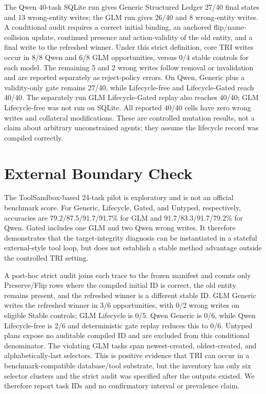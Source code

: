 \documentclass[10pt]{article}
\begin{document}
The Qwen 40-task SQLite run gives Generic Structured Ledger 27/40 final states and 13
wrong-entity writes; the GLM run gives 26/40 and 8 wrong-entity writes. A conditional audit
requires a correct initial binding, an anchored flip/name-collision update, continued presence
and action-validity of the old entity, and a final write to the refreshed winner. Under this
strict definition, core TRI writes occur in 8/8 Qwen and 6/8 GLM opportunities, versus 0/4
stable controls for each model. The remaining 5 and 2 wrong writes follow removal or invalidation
and are reported separately as reject-policy errors. On Qwen, Generic
plus a validity-only gate remains 27/40, while Lifecycle-free and Lifecycle-Gated reach 40/40.
The separately run GLM Lifecycle-Gated replay also reaches 40/40; GLM Lifecycle-free was not
run on SQLite. All reported 40/40 cells have zero wrong writes and collateral modifications.
These are controlled mutation results, not a claim about arbitrary
unconstrained agents: they assume the lifecycle record was compiled correctly.

\section{External Boundary Check}
The ToolSandbox-based 24-task pilot is exploratory and is not an official benchmark score.
For Generic, Lifecycle, Gated, and Untyped, respectively, accuracies are
79.2/87.5/91.7/91.7\% for GLM and 91.7/83.3/91.7/79.2\% for Qwen. Gated includes one GLM
and two Qwen wrong writes. It therefore demonstrates that the target-integrity diagnosis can be
instantiated in a stateful external-style tool loop, but does not establish a stable method
advantage outside the controlled TRI setting.

A post-hoc strict audit joins each trace to the frozen manifest and counts only Preserve/Flip rows
where the compiled initial ID is correct, the old entity remains present, and the refreshed winner
is a different stable ID. GLM Generic writes the refreshed winner in 3/6 opportunities, with 0/2
wrong writes on eligible Stable controls; GLM Lifecycle is 0/5. Qwen Generic is 0/6, while Qwen
Lifecycle-free is 2/6 and deterministic gate replay reduces this to 0/6. Untyped plans expose no
auditable compiled ID and are excluded from this conditional denominator. The violating GLM tasks
span newest-created, oldest-created, and alphabetically-last selectors. This is positive evidence
that TRI can occur in a benchmark-compatible database/tool substrate, but the inventory has only
six selector clusters and the strict audit was specified after the outputs existed. We therefore
report task IDs and no confirmatory interval or prevalence claim.
\end{document}
